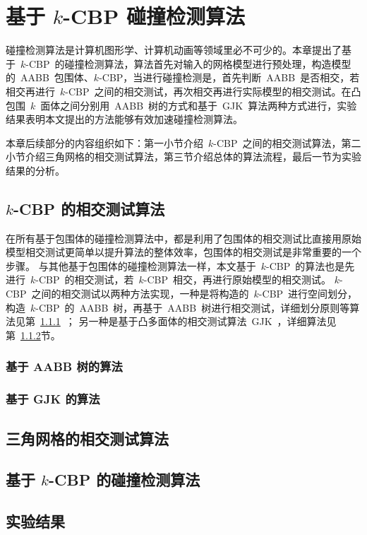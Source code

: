 

\chapter{基于 $k$-CBP 碰撞检测算法}
\label{cha:kcbp-collision-detection}

碰撞检测算法是计算机图形学、计算机动画等领域里必不可少的。本章提出了基于~$k$-CBP~的碰撞检测算法，算法首先对输入的网格模型进行预处理，构造模型的~AABB~包围体、$k$-CBP，当进行碰撞检测是，首先判断~AABB~是否相交，若相交再进行~$k$-CBP~之间的相交测试，再次相交再进行实际模型的相交测试。在凸包围~$k$~面体之间分别用~AABB~树的方式和基于~GJK~算法两种方式进行，实验结果表明本文提出的方法能够有效加速碰撞检测算法。

本章后续部分的内容组织如下：第一小节介绍~$k$-CBP~之间的相交测试算法，第二小节介绍三角网格的相交测试算法，第三节介绍总体的算法流程，最后一节为实验结果的分析。


\section{$k$-CBP 的相交测试算法}
\label{sec:kcbp:cd}

在所有基于包围体的碰撞检测算法中，都是利用了包围体的相交测试比直接用原始模型相交测试更简单以提升算法的整体效率，包围体的相交测试是非常重要的一个步骤。
与其他基于包围体的碰撞检测算法一样，本文基于~$k$-CBP~的算法也是先进行~$k$-CBP~的相交测试，若~$k$-CBP~相交，再进行原始模型的相交测试。
$k$-CBP~之间的相交测试以两种方法实现，一种是将构造的~$k$-CBP~进行空间划分，构造~$k$-CBP~的~AABB~树，再基于~AABB~树进行相交测试，详细划分原则等算法见第~\ref{subsec:kcbp:cd:aabb}~；
另一种是基于凸多面体的相交测试算法~GJK~，详细算法见第~\ref{subsec:kcbp:cd:gjk}节。

\subsection{基于 AABB 树的算法}
\label{subsec:kcbp:cd:aabb}


\subsection{基于 GJK 的算法}
\label{subsec:kcbp:cd:gjk}


\section{三角网格的相交测试算法}
\label{sec:gen-normals}

\section{基于 $k$-CBP 的碰撞检测算法}
\label{sec:search-planes}

\section{实验结果}
\label{sec:exper-cd}
